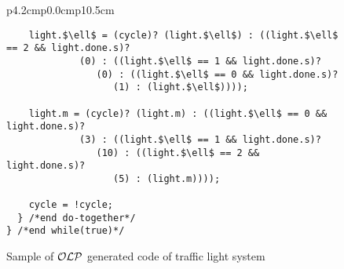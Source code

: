 \begin{figure*}
\begin{tabular}{p{4.2cm}p{0.0cm}p{10.5cm}}
\begin{lstlisting}
    light.$\ell$ = (cycle)? (light.$\ell$) : ((light.$\ell$ == 2 && light.done.s)? 
             (0) : ((light.$\ell$ == 1 && light.done.s)? 
                (0) : ((light.$\ell$ == 0 && light.done.s)? 
                   (1) : (light.$\ell$))));
              
    light.m = (cycle)? (light.m) : ((light.$\ell$ == 0 && light.done.s)? 
             (3) : ((light.$\ell$ == 1 && light.done.s)? 
                (10) : ((light.$\ell$ == 2 && light.done.s)? 
                   (5) : (light.m))));
    
    cycle = !cycle; 
  } /*end do-together*/ 
} /*end while(true)*/
\end{lstlisting}
\end{tabular}
\vspace{-2em}
\caption{Sample of $\mathcal{OLP}$ generated code of traffic light system}
\label{fig:caigtraffic}
\end{figure*}
